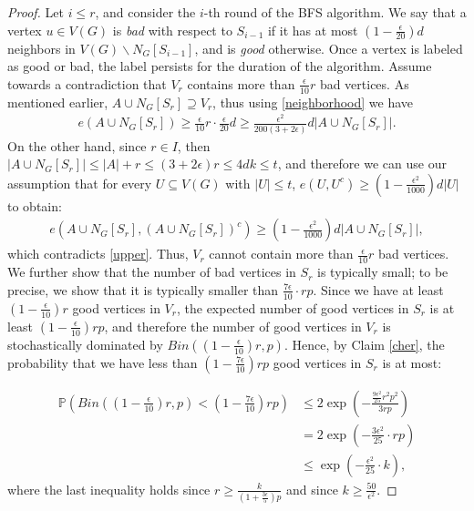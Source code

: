 \documentclass[notitlepage]{scrartcl}
\begin{document}
\begin{proof}
    Let $i\le r$, and consider the $i$-th round of the BFS algorithm. We say that a vertex $u\in V(G)$ is \textit{bad} with respect to $S_{i-1}$ if it has at most $\left(1-\frac{\epsilon}{20}\right)d$ neighbors in $V(G)\backslash N_G[S_{i-1}]$, and is \textit{good} otherwise. Once a vertex is labeled as good or bad, the label persists for the duration of the algorithm.
    Assume towards a contradiction that $V_r$ contains more than $\frac{\epsilon}{10} r$ bad vertices. As mentioned earlier, $A\cup N_G[S_r]\supseteq V_r$, thus using \eqref{neighborhood} we have
    \begin{align}\label{upper}
        e(A\cup N_G[S_r])\ge \frac{\epsilon}{10}r\cdot \frac{\epsilon}{20} d\ge \frac{\epsilon^2}{200(3+2\epsilon)}d|A\cup N_G[S_r]|.
    \end{align}
    On the other hand, since $r\in I$, then $|A\cup N_G[S_r]|\le |A|+r\le (3+2\epsilon)r\le 4dk\le t$, and therefore we can use our assumption that for every $U\subseteq V(G)$ with $|U|\le t$, $e(U,U^c)\ge \left(1-\frac{\epsilon^2}{1000}\right)d|U|$ to obtain:
    \begin{align*}
        e(A\cup N_G[S_r],(A\cup N_G[S_r])^c)\ge \left(1-\frac{\epsilon^2}{1000}\right)d|A\cup N_G[S_r]|,
    \end{align*}
    which contradicts \eqref{upper}. Thus, $V_r$ cannot contain more than $\frac{\epsilon}{10} r$ bad vertices. We further show that the number of bad vertices in $S_r$ is typically small; to be precise, we show that it is typically smaller than $\frac{7\epsilon}{10}\cdot rp$. Since we have at least $\left(1-\frac{\epsilon}{10}\right)r$ good vertices in $V_r$, the expected number of good vertices in $S_r$ is at least $\left(1-\frac{\epsilon}{10}\right)rp$, and therefore the number of good vertices in $V_r$ is stochastically dominated by $Bin\left(\left(1-\frac{\epsilon}{10}\right)r,p\right)$. Hence, by Claim \ref{cher}, the probability that we have less than $\left(1-\frac{7\epsilon}{10}\right)rp$ good vertices in $S_r$ is at most:

    \begin{align*}
        \mathbb{P}\left(Bin\left(\left(1-\frac{\epsilon}{10}\right)r,p\right)<\left(1-\frac{7\epsilon}{10}\right)rp\right)&\le 2\exp\left(-\frac{\frac{9\epsilon^2}{25} r^2p^2}{3rp}\right)\\
        &=2\exp\left(-\frac{3\epsilon^2}{25}\cdot rp\right)\\
        &\le \exp\left(-\frac{\epsilon^2}{25}\cdot k\right),
    \end{align*}
    where the last inequality holds since $r\ge\frac{k}{\left(1+\frac{3\epsilon}{5}\right)p}$ and since $k\ge \frac{50}{\epsilon^2}$.
    

\end{proof}
\end{document}
